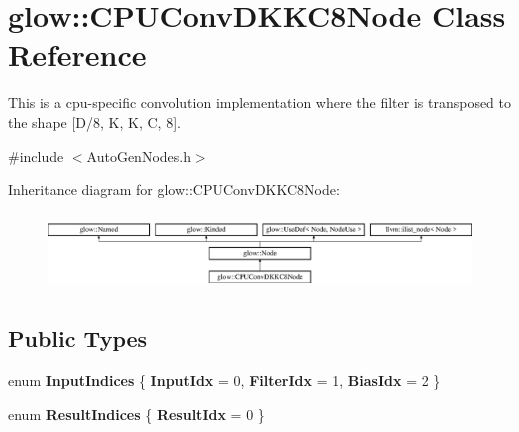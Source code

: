 \hypertarget{classglow_1_1_c_p_u_conv_d_k_k_c8_node}{}\section{glow\+:\+:C\+P\+U\+Conv\+D\+K\+K\+C8\+Node Class Reference}
\label{classglow_1_1_c_p_u_conv_d_k_k_c8_node}


This is a cpu-\/specific convolution implementation where the filter is transposed to the shape \mbox{[}D/8, K, K, C, 8\mbox{]}.  




{\ttfamily \#include $<$Auto\+Gen\+Nodes.\+h$>$}

Inheritance diagram for glow\+:\+:C\+P\+U\+Conv\+D\+K\+K\+C8\+Node\+:\begin{figure}[H]
\begin{center}
\leavevmode
\includegraphics[height=2.028986cm]{classglow_1_1_c_p_u_conv_d_k_k_c8_node}
\end{center}
\end{figure}
\subsection*{Public Types}
\begin{DoxyCompactItemize}
\item 
\mbox{\label{classglow_1_1_c_p_u_conv_d_k_k_c8_node_a849c8f11d57d1009f9bf5d8a75abe937}} 
enum {\bfseries Input\+Indices} \{ {\bfseries Input\+Idx} = 0, 
{\bfseries Filter\+Idx} = 1, 
{\bfseries Bias\+Idx} = 2
 \}
\item 
\mbox{\label{classglow_1_1_c_p_u_conv_d_k_k_c8_node_aad1e1f518dc5ab346c4c51ec50dc161f}} 
enum {\bfseries Result\+Indices} \{ {\bfseries Result\+Idx} = 0
 \}
\end{DoxyCompactItemize}
